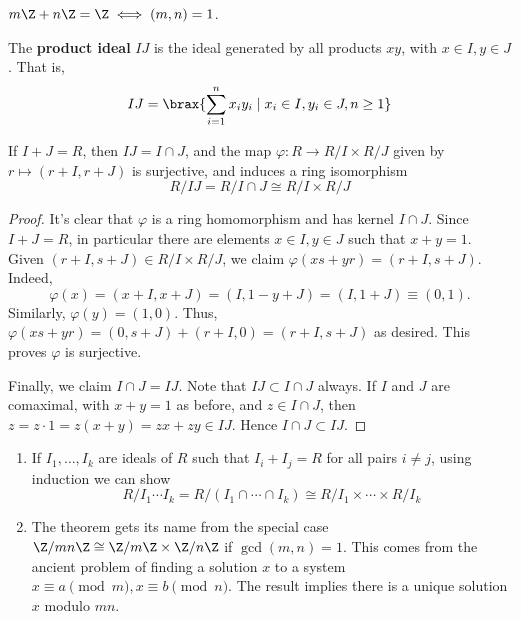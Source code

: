 \begin{ex}
    $m\Z + n\Z = \Z \iff (m,n)=1$.
\end{ex}

\begin{defn}
    The \textbf{product ideal} $IJ$ is the ideal generated by all products $xy$, with $x\in I,y \in J$. That is,
    $$IJ = \brax{\sum_{i=1}^nx_iy_i \mid x_i\in I,y_i \in J,n \geq 1}$$
\end{defn}

\begin{thm}
    If $I+J=R$, then $IJ=I \cap J$, and the map $\varphi: R \to R/I \times R/J$ given by $r \mapsto (r+I,r+J)$ is surjective, and induces a ring isomorphism
    $$R/IJ = R/I\cap J \cong R/I \times R/J$$
\end{thm}

\begin{proof}
    It's clear that $\varphi$ is a ring homomorphism and has kernel $I \cap J$. Since $I+J =R$, in particular there are elements $x \in I,y \in J$ such that $x+y =1$. Given $(r+I,s+J) \in R/I \times R/J$, we claim $\varphi(xs+yr)=(r+I,s+J)$. Indeed,
    $$\varphi(x) = (x+I,x+J)=(I,1-y+J)=(I,1+J) \equiv (0,1).$$
    Similarly, $\varphi (y) = (1,0)$. Thus, $\varphi(xs+yr) =(0,s + J) + (r+I,0)=(r+I,s+J)$ as desired. This proves $\varphi$ is surjective.

    Finally, we claim $I\cap J=IJ$. Note that $IJ \subset I \cap J$ always. If $I$ and $J$ are comaximal, with $x+y=1$ as before, and $z \in I \cap J$, then $z=z\cdot 1 = z(x+y) = zx+zy \in IJ$. Hence $I \cap J \subset IJ$.
\end{proof}

\begin{ex}
    \begin{enumerate}
        \item If $I_1,\dots,I_k$ are ideals of $R$ such that $I_i+I_j=R$ for all pairs $i\neq j$, using induction we can show
        $$R/I_1\cdots I_k = R/(I_1\cap \cdots \cap I_k) \cong R/I_1 \times \cdots \times R/I_k$$
        \item The theorem gets its name from the special case $\Z /mn \Z \cong \Z /m\Z \times \Z/n\Z$ if $\gcd(m,n)=1$. This comes from the ancient problem of finding a solution $x$ to a system $x\equiv a \pmod m,x \equiv b \pmod n$. The result implies there is a unique solution $x$ modulo $mn$.
    \end{enumerate}
\end{ex}

